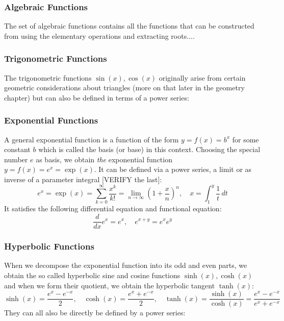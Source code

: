 \subsubsection{Algebraic Functions}
The set of algebraic functions contains all the functions that can be constructed from using the elementary operations and extracting roots....


\subsubsection{Trigonometric Functions}
The trigonometric functions $\sin(x), \cos(x)$ originally arise from certain geometric considerations about triangles (more on that later in the geometry chapter) but can also be defined in terms of a power series:






\subsubsection{Exponential Functions}
A general exponential function is a function of the form $y = f(x) = b^x$ for some constant $b$ which is called the basis (or base) in this context. Choosing the special number $e$ as basis, we obtain \emph{the} exponential function $y = f(x) = e^x = \exp(x)$. It can be defined via a power series, a limit or as inverse of a parameter integral [VERIFY the last]:
\begin{equation}
e^x 
= \exp(x)
= \sum_{k=0}^{\infty} \frac{x^k}{k!}
= \lim_{n \rightarrow \infty} \left( 1 + \frac{x}{n} \right)^n, \quad
x = \int_1^y \frac{1}{t} \, dt
\end{equation}
It satisfies the following differential equation and functional equation:
\begin{equation}
\frac{d}{dx} e^x = e^x, \quad
e^{x+y} = e^x e^y
\end{equation}



\subsubsection{Hyperbolic Functions}
When we decompose the exponential function into its odd and even parts, we obtain the so called hyperbolic sine and cosine functions $\sinh(x), \cosh(x)$ and when we form their quotient, we obtain the hyperbolic tangent $\tanh(x)$:
\begin{equation}
 \sinh(x) =	\frac{e^x - e^{-x}}{2}, \quad	
 \cosh(x) =	\frac{e^x + e^{-x}}{2}, \quad
 \tanh(x) =	\frac{\sinh(x)}{\cosh(x)} 
          = \frac{e^x - e^{-x}}{e^x + e^{-x}}
\end{equation}
They can all also be directly be defined by a power series:

